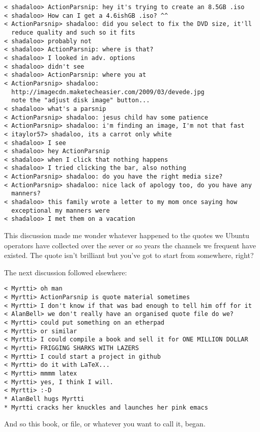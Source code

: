 \documentclass[a4paper]{book}
\begin{document}
\begin{verbatim}
< shadaloo> ActionParsnip: hey it's trying to create an 8.5GB .iso
< shadaloo> How can I get a 4.6ishGB .iso? ^^
< ActionParsnip> shadaloo: did you select to fix the DVD size, it'll 
  reduce quality and such so it fits
< shadaloo> probably not
< shadaloo> ActionParsnip: where is that?
< shadaloo> I looked in adv. options
< shadaloo> didn't see
< shadaloo> ActionParsnip: where you at
< ActionParsnip> shadaloo: 
  http://imagecdn.maketecheasier.com/2009/03/devede.jpg
  note the "adjust disk image" button...
< shadaloo> what's a parsnip
< ActionParsnip> shadaloo: jesus child hav some patience
< ActionParsnip> shadaloo: i'm finding an image, I'm not that fast
< itaylor57> shadaloo, its a carrot only white
< shadaloo> I see
< shadaloo> hey ActionParsnip
< shadaloo> when I click that nothing happens
< shadaloo> I tried clicking the bar, also nothing
< ActionParsnip> shadaloo: do you have the right media size?
< ActionParsnip> shadaloo: nice lack of apology too, do you have any 
  manners?
< shadaloo> this family wrote a letter to my mom once saying how 
  exceptional my manners were
< shadaloo> I met them on a vacation
\end{verbatim}

This discussion made me wonder whatever happened to the quotes we Ubuntu
operators have collected over the sever or so years the channels we frequent
have existed. The quote isn't brilliant but you've got to start from somewhere, right?
\newpage{}

The next discussion followed elsewhere:
\begin{verbatim}
< Myrtti> oh man
< Myrtti> ActionParsnip is quote material sometimes
< Myrtti> I don't know if that was bad enough to tell him off for it
< AlanBell> we don't really have an organised quote file do we?
< Myrtti> could put something on an etherpad
< Myrtti> or similar
< Myrtti> I could compile a book and sell it for ONE MILLION DOLLAR
< Myrtti> FRIGGING SHARKS WITH LAZERS
< Myrtti> I could start a project in github
< Myrtti> do it with LaTeX...
< Myrtti> mmmm latex
< Myrtti> yes, I think I will.
< Myrtti> :-D
* AlanBell hugs Myrtti 
* Myrtti cracks her knuckles and launches her pink emacs
\end{verbatim}

And so this book, or file, or whatever you want to call it, began.
\newpage{}

\cleardoublepage{} %






\end{document}
